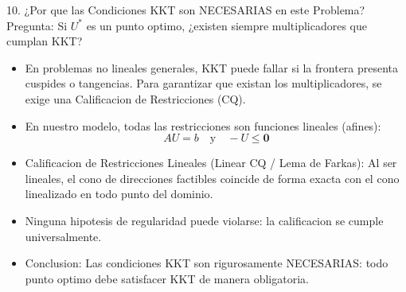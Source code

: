 \documentclass[aspectratio=169,10pt]{beamer}
\begin{document}
\begin{frame}{10. ¿Por que las Condiciones KKT son NECESARIAS en este Problema?}
  Pregunta: Si $U^*$ es un punto optimo, ¿existen siempre multiplicadores que cumplan KKT?
  \vspace{0.15cm}
  \begin{itemize}
    \item En problemas no lineales generales, KKT puede fallar si la frontera presenta cuspides o tangencias. Para garantizar que existan los multiplicadores, se exige una Calificacion de Restricciones (CQ).
    \vspace{0.15cm}
    \item En nuestro modelo, todas las restricciones son funciones lineales (afines):
    \begin{equation*}
      A U = b \quad \text{y} \quad -U \le \mathbf{0}
    \end{equation*}
    \item Calificacion de Restricciones Lineales (Linear CQ / Lema de Farkas):
    Al ser lineales, el cono de direcciones factibles coincide de forma exacta con el cono linealizado en todo punto del dominio.
    \vspace{0.15cm}
    \item Ninguna hipotesis de regularidad puede violarse: la calificacion se cumple universalmente.
    \vspace{0.15cm}
    \item Conclusion: Las condiciones KKT son rigurosamente NECESARIAS: todo punto optimo debe satisfacer KKT de manera obligatoria.
  \end{itemize}
\end{frame}
\end{document}
